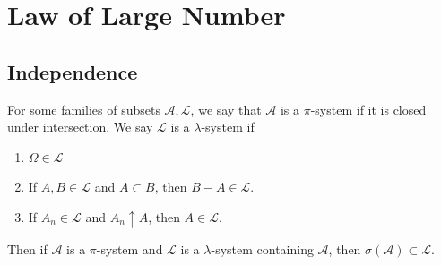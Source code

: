 \section{Law of Large Number}

\subsection{Independence}

\begin{theorem}
    [$\pi$-$\lambda$] For some families of subsets $\mathcal{A},\mathcal{L}$, we say that $\mathcal{A}$ is a $\pi$-system if it is closed under intersection. We say $\mathcal{L}$ is a $\lambda$-system if
    \begin{enumerate}
        \item $\Omega \in \mathcal{L}$
        \item If $A,B \in \mathcal{L}$ and $A\subset B$, then $B-A \in \mathcal{L}$.
        \item If $A_n \in \mathcal{L}$ and $A_n \uparrow A$, then $A\in\mathcal{L}$.
    \end{enumerate}
    Then if $\mathcal{A}$ is a $\pi$-system and $\mathcal{L}$ is a $\lambda$-system containing $\mathcal{A}$, then $\sigma(\mathcal{A}) \subset \mathcal{L}$.
\end{theorem}


